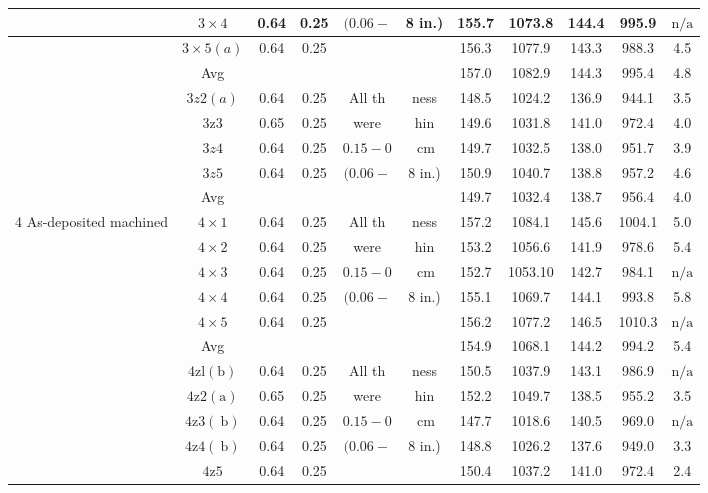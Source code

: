 \documentclass[10pt]{article}
\begin{document}
\begin{center}
\begin{tabular}{|c|c|c|c|c|c|c|c|c|c|c|}
\hline
 & $3 \times 4$ & 0.64 & 0.25 & $(0.06-$ & 8 in.) & 155.7 & 1073.8 & 144.4 & 995.9 & $\mathrm{n} / \mathrm{a}$ \\
\hline
 & $3 \times 5(a)$ & 0.64 & 0.25 &  &  & 156.3 & 1077.9 & 143.3 & 988.3 & 4.5 \\
\hline
 & Avg &  &  &  &  & 157.0 & 1082.9 & 144.3 & 995.4 & 4.8 \\
\hline
 & $3 z 2(a)$ & 0.64 & 0.25 & All th & ness & 148.5 & 1024.2 & 136.9 & 944.1 & 3.5 \\
\hline
 & $3 \mathrm{z} 3$ & 0.65 & 0.25 & were & hin & 149.6 & 1031.8 & 141.0 & 972.4 & 4.0 \\
\hline
 & $3 z 4$ & 0.64 & 0.25 & $0.15-0$ & $\mathrm{~cm}$ & 149.7 & 1032.5 & 138.0 & 951.7 & 3.9 \\
\hline
 & $3 z 5$ & 0.64 & 0.25 & $(0.06-$ & 8 in.) & 150.9 & 1040.7 & 138.8 & 957.2 & 4.6 \\
\hline
 & Avg &  &  &  &  & 149.7 & 1032.4 & 138.7 & 956.4 & 4.0 \\
\hline
\multirow[t]{12}{*}{4 As-deposited machined} & $4 \times 1$ & 0.64 & 0.25 & All th & ness & 157.2 & 1084.1 & 145.6 & 1004.1 & 5.0 \\
\hline
 & $4 \times 2$ & 0.64 & 0.25 & were & hin & 153.2 & 1056.6 & 141.9 & 978.6 & 5.4 \\
\hline
 & $4 \times 3$ & 0.64 & 0.25 & $0.15-0$ & $\mathrm{~cm}$ & 152.7 & 1053.10 & 142.7 & 984.1 & $\mathrm{n} / \mathrm{a}$ \\
\hline
 & $4 \times 4$ & 0.64 & 0.25 & $(0.06-$ & 8 in.) & 155.1 & 1069.7 & 144.1 & 993.8 & 5.8 \\
\hline
 & $4 \times 5$ & 0.64 & 0.25 &  &  & 156.2 & 1077.2 & 146.5 & 1010.3 & $\mathrm{n} / \mathrm{a}$ \\
\hline
 & Avg &  &  &  &  & 154.9 & 1068.1 & 144.2 & 994.2 & 5.4 \\
\hline
 & $4 \mathrm{zl}(\mathrm{b})$ & 0.64 & 0.25 & All th & ness & 150.5 & 1037.9 & 143.1 & 986.9 & $\mathrm{n} / \mathrm{a}$ \\
\hline
 & $4 \mathrm{z} 2(\mathrm{a})$ & 0.65 & 0.25 & were & hin & 152.2 & 1049.7 & 138.5 & 955.2 & 3.5 \\
\hline
 & $4 \mathrm{z} 3(\mathrm{~b})$ & 0.64 & 0.25 & $0.15-0$ & $\mathrm{~cm}$ & 147.7 & 1018.6 & 140.5 & 969.0 & $\mathrm{n} / \mathrm{a}$ \\
\hline
 & $4 \mathrm{z} 4(\mathrm{~b})$ & 0.64 & 0.25 & $(0.06-$ & 8 in.) & 148.8 & 1026.2 & 137.6 & 949.0 & 3.3 \\
\hline
 & $4 \mathrm{z} 5$ & 0.64 & 0.25 &  &  & 150.4 & 1037.2 & 141.0 & 972.4 & 2.4 \\

\end{tabular}
\end{center}
\end{document}
